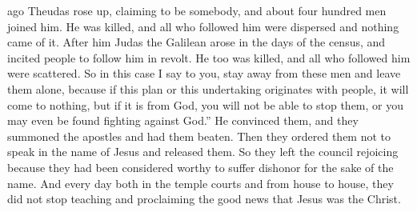 {ago
Theudas
rose up,
claiming
to be
somebody,
and about
four hundred
men
joined him. He was killed,
and
all
who followed
him
were dispersed
and nothing
came of it.
After
him
Judas
the Galilean
arose
in
the days
of the census,
and
incited
people
to follow
him
in revolt. He too
was killed,
and
all
who followed
him
were scattered.
So
in this case I say
to you,
stay away
from
these
men
and
leave
them
alone, because
if
this
plan
or
this undertaking originates with
people,
it will come to nothing,
but
if
it is
from
God,
you will
not
be able
to stop
them,
or you may even be found
fighting against God.” He convinced them,
and
they summoned
the apostles
and had
them beaten.
Then they ordered
them not
to speak
in
the name
of Jesus
and
released them.
So
they left
the council
rejoicing
because they had been considered worthy
to suffer dishonor
for the sake
of the name.
And every
day
both
in
the temple courts
and
from house to house,
they did
not
stop
teaching
and
proclaiming the good news
that Jesus
was the Christ.

}
